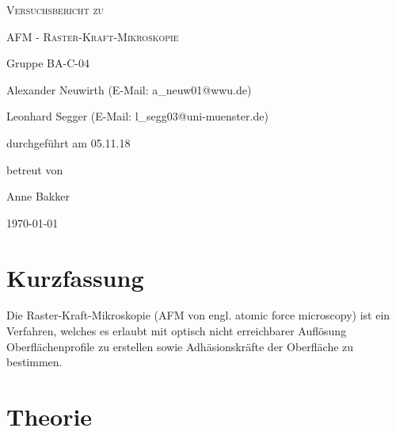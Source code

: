 \documentclass[
	a4paper,
	12pt,
	pagesize,
	ngerman
]{scrartcl}
\begin{document}
	\begin{titlepage}
		\centering
		{\scshape\LARGE Versuchsbericht zu \par}
		\vspace{1cm}
		{\scshape\huge AFM - Raster-Kraft-Mikroskopie \par}
		\vspace{2.5cm}
		{\LARGE Gruppe BA-C-04 \par}
		\vspace{0.5cm}

		{\large Alexander Neuwirth (E-Mail: a\_neuw01@wwu.de) \par}
		{\large Leonhard Segger (E-Mail: l\_segg03@uni-muenster.de) \par}
		\vfill

		durchgeführt am 05.11.18\par
		betreut von\par
		{\large Anne Bakker}

		\vfill

		{\large \today\par}
	\end{titlepage}
	\tableofcontents
	\newpage


	\section{Kurzfassung}
	Die Raster-Kraft-Mikroskopie (AFM von engl. atomic force microscopy) ist ein Verfahren, welches es erlaubt mit optisch nicht erreichbarer Auflösung Oberflächenprofile zu erstellen sowie Adhäsionskräfte der Oberfläche zu bestimmen. %

	\section{Theorie}
	\label{sec_theorie}
\end{document}

